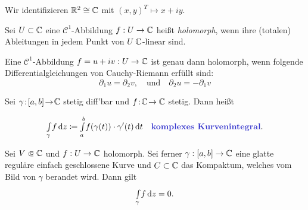 \documentclass{cheat-sheet}
\newcommand{\Cont}{\mathcal{C}} %
\theoremstyle{definition}
\begin{document}

\begin{bem}
  Wir identifizieren $\mathbb{R}^2 \cong \mathbb{C}$ mit $(x, y)^T \mapsto x + iy$.
\end{bem}

\begin{defn}
  Sei $U \subset \mathbb{C}$ eine $\Cont^1$-Abbildung $f : U \to \mathbb{C}$ heißt \emph{holomorph}, wenn ihre (totalen) Ableitungen in jedem Punkt von $U$ $\mathbb{C}$-linear sind.
\end{defn}

\begin{beob}
  Eine $\Cont^1$-Abbildung $f = u + iv : U \to \mathbb{C}$ ist genau dann holomorph, wenn folgende Differentialgleichungen von Cauchy-Riemann erfüllt sind:
  \[
    \partial_1 u = \partial_2 v,
    \quad \text{und} \quad
    \partial_2 u = - \partial_1 v
  \]
\end{beob}



\begin{defn}
  Sei $\gamma \!:\! \left[ a, b \right] \!\to\! \mathbb{C}$ stetig diff'bar und $f \!:\! \mathbb{C} \!\to \mathbb{C}$ stetig. Dann heißt

  \[
    \Int{\gamma}{}{f}{z} \coloneqq \Int{a}{b}{f(\gamma(t)) \cdot \gamma'(t)}{t}
    \quad \text{\emph{komplexes Kurvenintegral}.}
  \]
\end{defn}

\begin{satz}
  Sei $V \opn \C$ und $f : U \to \mathbb{C}$ holomorph. Sei ferner $\gamma : \left[ a, b \right] \to \mathbb{C}$ eine glatte reguläre einfach geschlossene Kurve und $C \subset \mathbb{C}$ das Kompaktum, welches vom Bild von $\gamma$ berandet wird. Dann gilt
  \[ {\textstyle \int\limits_{\gamma}^{}} f \,\mathrm{d} z = 0. \]
\end{satz}
\end{document}
